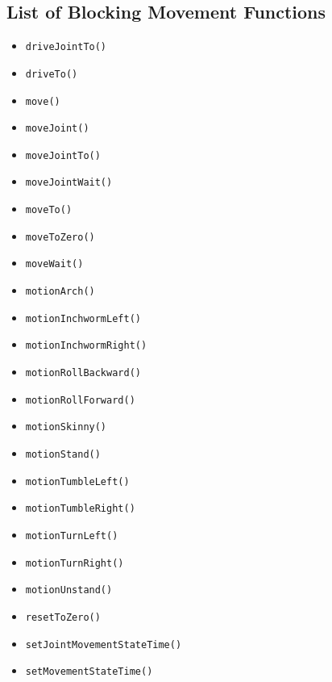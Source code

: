 \documentclass{article}
\begin{document}
\subsection{List of Blocking Movement Functions}
\begin{itemize}
\item \texttt{driveJointTo()}
\item \texttt{driveTo()}
\item \texttt{move()}
\item \texttt{moveJoint()}
\item \texttt{moveJointTo()}
\item \texttt{moveJointWait()}
\item \texttt{moveTo()}
\item \texttt{moveToZero()}
\item \texttt{moveWait()}
\item \texttt{motionArch()}
\item \texttt{motionInchwormLeft()}
\item \texttt{motionInchwormRight()}
\item \texttt{motionRollBackward()}
\item \texttt{motionRollForward()}
\item \texttt{motionSkinny()}
\item \texttt{motionStand()}
\item \texttt{motionTumbleLeft()}
\item \texttt{motionTumbleRight()}
\item \texttt{motionTurnLeft()}
\item \texttt{motionTurnRight()}
\item \texttt{motionUnstand()}
\item \texttt{resetToZero()}
\item \texttt{setJointMovementStateTime()}
\item \texttt{setMovementStateTime()}
\end{itemize}
\end{document}
